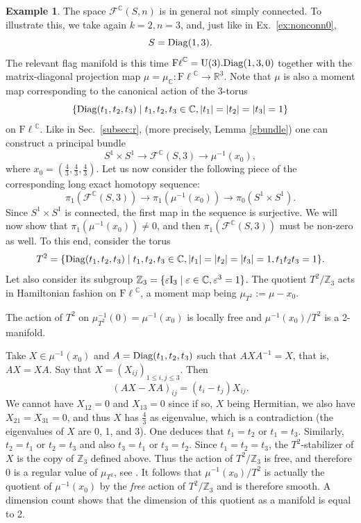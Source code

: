 \documentclass[12pt]{amsart}
\theoremstyle{definition}
\newtheorem{ex}[thm]{Example}
\theoremstyle{remark}
\newcommand{\RR}{\mathbb R}
\newcommand{\ZZ}{\mathbb Z}
\newcommand{\CC}{\mathbb C}
\newcommand{\Fl}{{\mathrm{F\ell}}}
\begin{document}
\begin{ex} \label{ex:nonsconn} The space ${\mathcal F}^\CC(S, n)$ is in general not simply connected. To illustrate this, we take again 
$k=2, n=3$, and, just like in Ex.~\ref{ex:nonconn0}, 
$$S={\rm Diag}(1,3).$$
The relevant flag manifold is this time $\Fl^\CC={\rm U}(3).{\rm Diag}(1,3,0)$ together with the matrix-diagonal projection map $\mu=\mu_\CC: \Fl^\CC\to \RR^3$.
Note that $\mu$ is also a moment map corresponding to the canonical action of
the 3-torus $$\{{\rm Diag} (t_1, t_2, t_3) \mid t_1, t_2, t_3\in \CC, |t_1|=|t_2|=|t_3|=1\}$$ on $\Fl^\CC$.
 Like in Sec.~\ref{subsec:r}, (more precisely, Lemma \ref{gbundle}) one can construct a principal bundle
\begin{equation}\label{s1t}S^1\times S^1 \to  {\mathcal F}^\CC (S, 3) \to \mu^{-1}(x_0),\end{equation}
where $x_0=\left(\frac{4}{3}, \frac{4}{3}, \frac{4}{3}\right).$
Let us now consider the following piece of the corresponding long exact homotopy sequence:
$$\pi_1({\mathcal F}^\CC (S, 3) )\to \pi_1(\mu^{-1}(x_0)) \to \pi_0(S^1\times S^1).$$
Since $S^1\times S^1$ is connected,  the first map in the sequence is surjective. 
We will now show that $\pi_1(\mu^{-1}(x_0))\neq 0$, and then $\pi_1({\mathcal F}^\CC (S, 3) )$ must be non-zero as well. 
To this end, consider
the torus $$T^2=\{{\rm Diag} (t_1, t_2, t_3) \mid t_1, t_2, t_3\in \CC, |t_1|=|t_2|=|t_3|=1, t_1t_2t_3=1\}.$$
Let also consider its subgroup $\ZZ_3=\{\varepsilon {\rm I}_3 \mid \varepsilon \in \CC, \varepsilon^3=1\}$. The quotient
$T^2/\ZZ_3$ 
 acts in Hamiltonian fashion on $\Fl^\CC$, a moment map being $\mu_{T^2}:=\mu-x_0$. 



 The action of $T^2$ on $\mu_{T^2}^{-1}(0)=\mu^{-1}(x_0)$ is locally free and $\mu^{-1}(x_0)/T^2$ is a 2-manifold. 

\noindent Take $X \in \mu^{-1}(x_0)$ and $A={\rm Diag}(t_1, t_2, t_3)$ such that $AXA^{-1}=X$, that is,
$AX=XA$. Say that $X=(X_{ij})_{1\le i, j\le 3}$. Then
$$(AX-XA)_{ij}= (t_i-t_j)X_{ij}.$$
We cannot have $X_{12}=0$ and $X_{13}=0$ since if so, $X$ being Hermitian, we also have
$X_{21}=X_{31}=0$, and thus $X$ has $\frac{4}{3}$ as eigenvalue, which is a contradiction (the eigenvalues of $X$ are 0, 1, and 3). One deduces that $t_1=t_2$ or $t_1=t_3$. Similarly, $t_2=t_1$ or $t_2=t_3$ and also 
$t_3=t_1$ or $t_3=t_2$. Since $t_1=t_2=t_3$, the $T^2$-stabilizer of $X$ is the copy of $\ZZ_3$ defined above.  Thus the  action of $T^2/\ZZ_3$ is free, and therefore $0$ is a regular value of $\mu_{T^2}$, see \cite[Sect.~23]{ACS}. It follows that  $\mu^{-1}(x_0)/T^2$ is actually the quotient of $\mu^{-1}(x_0)$ by the {\it free} action of $T^2/\ZZ_3$ and is therefore smooth. A dimension count shows that the dimension of this quotient as a manifold is equal to 2.


\end{ex}
\end{document}

